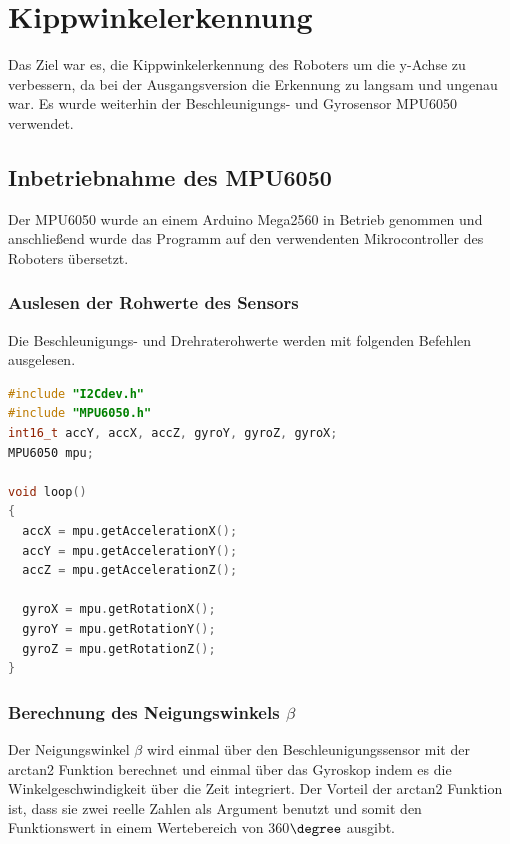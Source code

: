 

\newpage
\renewcommand{\autoren}{Severin Schendel}

\section{Kippwinkelerkennung}

Das Ziel war es, die Kippwinkelerkennung des Roboters um die y-Achse zu verbessern, da bei der Ausgangsversion die Erkennung zu langsam und ungenau war. Es wurde weiterhin der Beschleunigungs- und Gyrosensor MPU6050 verwendet.

\subsection{Inbetriebnahme des MPU6050}
Der MPU6050 wurde an einem Arduino Mega2560 in Betrieb genommen und anschließend wurde das Programm auf den verwendenten Mikrocontroller des Roboters übersetzt.
\subsubsection{Auslesen der Rohwerte des Sensors}
Die Beschleunigungs- und Drehraterohwerte werden mit folgenden Befehlen ausgelesen.
\begin{lstlisting}[language=C++, caption=Auslesen der Sensorwerte, label={lst:Sensorwerte}]
#include "I2Cdev.h"
#include "MPU6050.h"
int16_t accY, accX, accZ, gyroY, gyroZ, gyroX;
MPU6050 mpu;

void loop()
{
  accX = mpu.getAccelerationX();
  accY = mpu.getAccelerationY();
  accZ = mpu.getAccelerationZ();

  gyroX = mpu.getRotationX();
  gyroY = mpu.getRotationY();
  gyroZ = mpu.getRotationZ();
}
\end{lstlisting}

\subsubsection{Berechnung des Neigungswinkels \(\beta\)}
Der Neigungswinkel \(\beta\) wird einmal über den Beschleunigungssensor mit der arctan2 Funktion berechnet und einmal über das Gyroskop indem es die Winkelgeschwindigkeit über die Zeit integriert. Der Vorteil der arctan2 Funktion ist, dass sie zwei reelle Zahlen als Argument benutzt und somit den Funktionswert in einem Wertebereich von 360\(\degree\) ausgibt.

